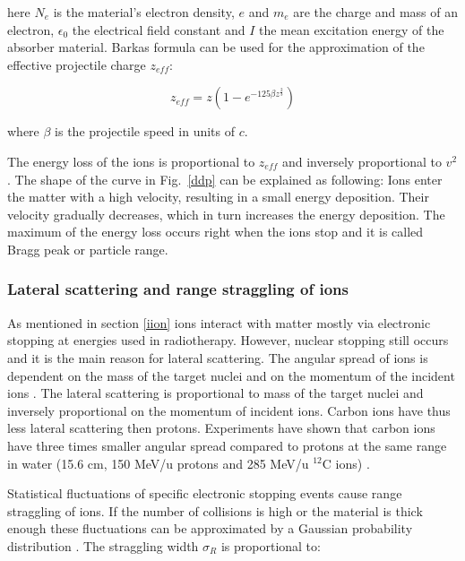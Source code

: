 \documentclass[type=dr, dr=rernat, accentcolor=tud7b,colorbacktitle, bigchapter, openright, twoside, 12pt ]{tudthesis}
\begin{document}
here $N_{e}$ is the material's electron density, $e$ and $m_{e}$ are the charge and mass 
of an electron, $\epsilon_{0}$ the electrical field constant and $I$ the mean excitation energy of the absorber material. 
Barkas formula \cite{Barkas1963} can be used for the approximation of the effective projectile charge $z_{eff}$: 

\begin{equation}
 z_{eff} = z \left( 1 - e^{-125 \beta z^{\frac{2}{3}}} \right)
\end{equation}

where $\beta$ is the projectile speed in units of $c$.

The energy loss of the ions is proportional to $z_{eff}$ and inversely proportional to $v^2$. The shape of the curve in Fig.~\ref{ddp} can be explained as following: Ions enter the matter with a high velocity, resulting in a small energy deposition. Their velocity gradually decreases, which in turn increases the energy deposition. The maximum of the energy loss occurs right when the ions stop and it is called Bragg peak or particle range.

\subsubsection{Lateral scattering and range straggling of ions}
\label{scat}
As mentioned in section \ref{iion} ions interact with matter mostly via electronic stopping at energies used in radiotherapy. However, nuclear stopping still occurs and it is the main reason for lateral scattering.
The angular spread of ions is dependent on the mass of the target nuclei and on the momentum of the incident ions \cite{Moliere1948}. The lateral scattering is proportional to mass of the target nuclei and inversely proportional
on the momentum of incident ions. Carbon ions have thus less lateral scattering then protons. Experiments have shown that carbon ions have three times smaller angular spread compared to protons at the same range in water 
(15.6 cm, 150 MeV/u protons and 285 MeV/u $^{12}$C ions) \cite{Schardt2010}.

Statistical fluctuations of specific electronic stopping events cause range straggling of ions. If the number of collisions is high or the material is thick enough these fluctuations can be approximated by
a Gaussian probability distribution \cite{Bohr1940, Ahlen1980}. The straggling width $\sigma_R$ is proportional to:
\end{document}
